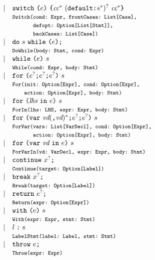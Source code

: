 \[
\begin{array}{llll}
& \mid &  {\tt switch} \ \verb+(+\expr\verb+)+ \ \verb+{+\cc^* \ ({\tt default} \verb+:+ \stmt^{*})^? \ \cc^* \verb+}+\\
&& \mtt{Switch(cond:~Expr, frontCases:~List[Case],}\\
&&\mtt{\phantom{Switch(}defopt:~Option[List[Stmt]],}\\
&&\mtt{\phantom{Switch(}backCases:~List[Case])}\\
& \mid & {\tt do} \ \stmt \ {\tt while} \ \verb+(+\expr\verb+)+ \verb+;+ \\
&& \mtt{DoWhile(body:~Stmt, cond:~Expr)}\\
  &\mid& {\tt while} \ \verb+(+\expr\verb+)+ \ \stmt \\
&& \mtt{While(cond:~Expr, body:~Stmt)}\\
  &\mid& {\tt for} \ \verb+(+\expr^?\verb+;+ \expr^?\verb+;+ \expr^? \verb+)+ \ \stmt\\
&& \mtt{For(init:~Option[Expr], cond:~Option[Expr],}\\
&&\mtt{\phantom{For(}action:~Option[Expr], body:~Stmt)}\\
  &\mid& {\tt for} \ \verb+(+ \lhs \ {\tt in} \ \expr \verb+)+ \ \stmt \\
&&\mtt{ForIn(lhs:~LHS, expr:~Expr, body:~Stmt)}\\
  &\mid& {\tt for} \ \verb+(+{\tt var} \ \vd(\verb+,+ \vd)^*\verb+;+ \expr^?\verb+;+ \expr^?\verb+)+ \ \stmt\\
&& \mtt{ForVar(vars:~List[VarDecl], cond:~Option[Expr],}\\
&&\mtt{\phantom{ForVar(}action:~Option[Expr], body:~Stmt)}\\
&\mid& {\tt for} \ \verb+(+{\tt var} \ \vd \ {\tt in} \ \expr \verb+)+ \ \stmt \\
&& \mtt{ForVarIn(vd:~VarDecl, expr:~Expr, body:~Stmt)}\\
& \mid & {\tt continue} \  \myid^{?} \verb+;+ \\
&& \mtt{Continue(target:~Option[Label])}\\
& \mid & {\tt break} \  \myid^{?} \verb+;+ \\
&& \mtt{Break(target:~Option[Label])}\\
& \mid & {\tt return} \ \expr^? \verb+;+ \\
&& \mtt{Return(expr:~Option[Expr])}\\
& \mid & {\tt with} \ \verb+(+\expr\verb+)+ \ \stmt \\
&& \mtt{With(expr:~Expr, stmt:~Stmt)}\\
& \mid & l \; \verb+:+ \; \stmt \\
&& \mtt{LabelStmt(label:~Label, stmt:~Stmt)}\\
& \mid & {\tt throw} \ \expr \verb+;+ \\
&& \mtt{Throw(expr:~Expr)}\\


\end{array}\]

